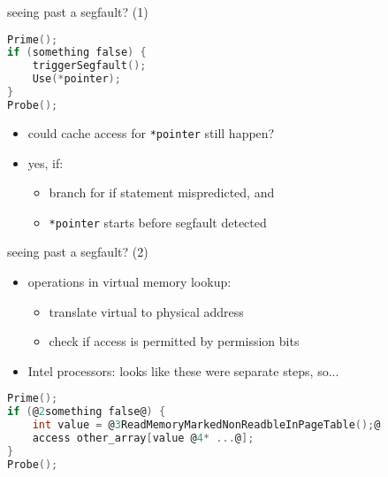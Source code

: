 \begin{frame}[fragile]{seeing past a segfault? (1)}
\begin{lstlisting}[language=C,style=small]
Prime();
if (something false) {
    triggerSegfault();
    Use(*pointer);
}
Probe();
\end{lstlisting}
\begin{itemize}
\item could cache access for \texttt{*pointer} still happen?
\item yes, if:
    \begin{itemize}
    \item branch for if statement mispredicted, and
    \item \texttt{*pointer} starts before segfault detected
    \end{itemize}
\end{itemize}
\end{frame}

\begin{frame}[fragile]{seeing past a segfault? (2)}
\begin{itemize}
\item operations in virtual memory lookup:
    \begin{itemize}
    \item translate virtual to physical address
    \item check if access is permitted by permission bits
    \end{itemize}
\item Intel processors: looks like these were separate steps, so...
\end{itemize}
\begin{lstlisting}[language=C,style=small]
Prime();
if (@2something false@) {
    int value = @3ReadMemoryMarkedNonReadbleInPageTable();@
    access other_array[value @4* ...@];
}
Probe();
\end{lstlisting}
\end{frame}
